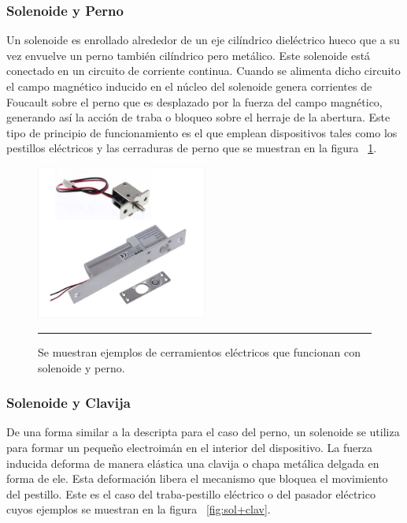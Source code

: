 \subsubsection{Solenoide y Perno}
Un solenoide es enrollado alrededor de un eje cilíndrico dieléctrico hueco que a su vez envuelve un perno también cilíndrico pero metálico. Este solenoide está conectado en un circuito de corriente continua. Cuando se alimenta dicho circuito el campo magnético inducido en el núcleo del solenoide genera corrientes de Foucault sobre el perno que es desplazado por la fuerza del campo magnético, generando así la acción de traba o bloqueo sobre el herraje de la abertura. 
Este tipo de principio de funcionamiento es el que emplean dispositivos tales como los pestillos eléctricos y las cerraduras de perno que se muestran en la figura ~\ref{fig:sol+perno}.

\begin{figure}[htbp]
	\centering
	\includegraphics[width=0.5\textwidth]{Pictures/sol+perno.png}
	\rule{35em}{1pt}
	\caption[Cerramientos de perno]{Se muestran ejemplos de cerramientos eléctricos que funcionan con solenoide y perno. }
	\label{fig:sol+perno}
\end{figure}

\subsubsection{Solenoide y Clavija}
De una forma similar a la descripta para el caso del perno, un solenoide se utiliza para formar un pequeño electroimán en el interior del dispositivo. La fuerza inducida deforma de manera elástica una clavija o chapa metálica delgada en forma de ele. Esta deformación libera el mecanismo que bloquea el movimiento del pestillo. Este es el caso del traba-pestillo eléctrico o del pasador eléctrico cuyos ejemplos se muestran en la figura ~\ref{fig:sol+clav}.

